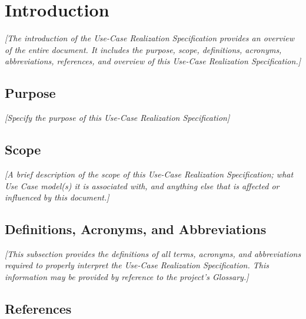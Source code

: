\documentclass[12pt, a4paper, titlepage]{article}
\begin{document}
\section{Introduction}

{\color{blue}\textit{[The introduction of the Use-Case Realization Specification provides an overview of the entire document. It includes the purpose, scope, definitions, acronyms, abbreviations, references, and overview of this Use-Case Realization Specification.]}}

\subsection{Purpose}

{\color{blue}\textit{[Specify the purpose of this Use-Case Realization Specification]}}

\subsection{Scope}

{\color{blue}\textit{[A brief description of the scope of this Use-Case Realization Specification; what Use Case model(s) it is associated with, and anything else that is affected or influenced by this document.]}}

\subsection{Definitions, Acronyms, and Abbreviations}

{\color{blue}\textit{[This subsection provides the definitions of all terms, acronyms, and abbreviations required to properly interpret the Use-Case Realization Specification.  This information may be provided by reference to the project’s Glossary.]}}

\subsection{References}
\end{document}
